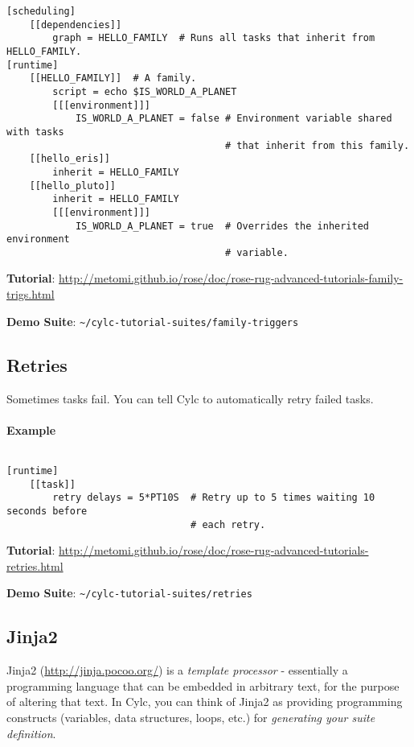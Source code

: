 \begin{lstlisting}
[scheduling]
    [[dependencies]]
        graph = HELLO_FAMILY  # Runs all tasks that inherit from HELLO_FAMILY.
[runtime]
    [[HELLO_FAMILY]]  # A family.
        script = echo $IS_WORLD_A_PLANET
        [[[environment]]]
            IS_WORLD_A_PLANET = false # Environment variable shared with tasks
                                      # that inherit from this family.
    [[hello_eris]]
        inherit = HELLO_FAMILY
    [[hello_pluto]]
        inherit = HELLO_FAMILY
        [[[environment]]]
            IS_WORLD_A_PLANET = true  # Overrides the inherited environment
                                      # variable.
\end{lstlisting}

\begin{shaded*}
\textbf{Tutorial}:
\url{http://metomi.github.io/rose/doc/rose-rug-advanced-tutorials-family-trigs.html}

\textbf{Demo Suite}: \lstinline=~/cylc-tutorial-suites/family-triggers=
\end{shaded*}

\subsection{Retries}
Sometimes tasks fail. You can tell Cylc to automatically retry failed tasks.

\paragraph*{Example} $ $

\begin{lstlisting}
[runtime]
    [[task]]
        retry delays = 5*PT10S  # Retry up to 5 times waiting 10 seconds before
                                # each retry.
\end{lstlisting}

\begin{shaded*}
\textbf{Tutorial}:
\url{http://metomi.github.io/rose/doc/rose-rug-advanced-tutorials-retries.html}

\textbf{Demo Suite}: \lstinline=~/cylc-tutorial-suites/retries=
\end{shaded*}


\subsection{Jinja2}

Jinja2 (\url{http://jinja.pocoo.org/}) is a {\em template processor} -
essentially a programming language that can be embedded in arbitrary text,
for the purpose of altering that text.  In Cylc, you can think of
Jinja2 as providing programming constructs (variables, data structures,
loops, etc.) for {\em generating your suite definition}.

